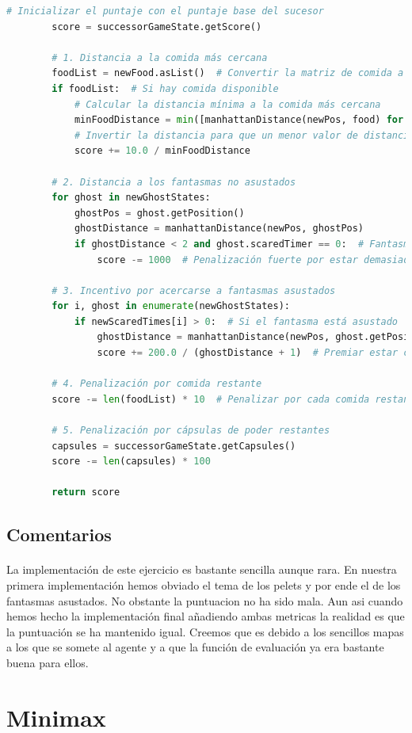 \documentclass{report}
\begin{document}
\begin{lstlisting}[language=Python, caption=Implementación final del agente reflex]
        # Inicializar el puntaje con el puntaje base del sucesor
        score = successorGameState.getScore()

        # 1. Distancia a la comida más cercana
        foodList = newFood.asList()  # Convertir la matriz de comida a una lista de posiciones
        if foodList:  # Si hay comida disponible
            # Calcular la distancia mínima a la comida más cercana
            minFoodDistance = min([manhattanDistance(newPos, food) for food in foodList])
            # Invertir la distancia para que un menor valor de distancia dé un mayor puntaje
            score += 10.0 / minFoodDistance

        # 2. Distancia a los fantasmas no asustados
        for ghost in newGhostStates:
            ghostPos = ghost.getPosition()
            ghostDistance = manhattanDistance(newPos, ghostPos)
            if ghostDistance < 2 and ghost.scaredTimer == 0:  # Fantasma no asustado y muy cerca
                score -= 1000  # Penalización fuerte por estar demasiado cerca de un fantasma peligroso

        # 3. Incentivo por acercarse a fantasmas asustados
        for i, ghost in enumerate(newGhostStates):
            if newScaredTimes[i] > 0:  # Si el fantasma está asustado
                ghostDistance = manhattanDistance(newPos, ghost.getPosition())
                score += 200.0 / (ghostDistance + 1)  # Premiar estar cerca de un fantasma asustado

        # 4. Penalización por comida restante
        score -= len(foodList) * 10  # Penalizar por cada comida restante en el estado sucesor

        # 5. Penalización por cápsulas de poder restantes
        capsules = successorGameState.getCapsules()
        score -= len(capsules) * 100

        return score
          \end{lstlisting}
        \subsection*{Comentarios}
          \paragraph*{}{
            La implementación de este ejercicio es bastante sencilla aunque rara.
            En nuestra primera implementación hemos obviado el tema de los pelets y por ende el de los fantasmas asustados.
            No obstante la puntuacion no ha sido mala.
            Aun asi cuando hemos hecho la implementación final añadiendo ambas metricas la realidad es que la puntuación se ha mantenido igual.
            Creemos que es debido a los sencillos mapas a los que se somete al agente y a que la función de evaluación ya era bastante buena para ellos.
        }
      \clearpage\section{Minimax} %
\end{document}
